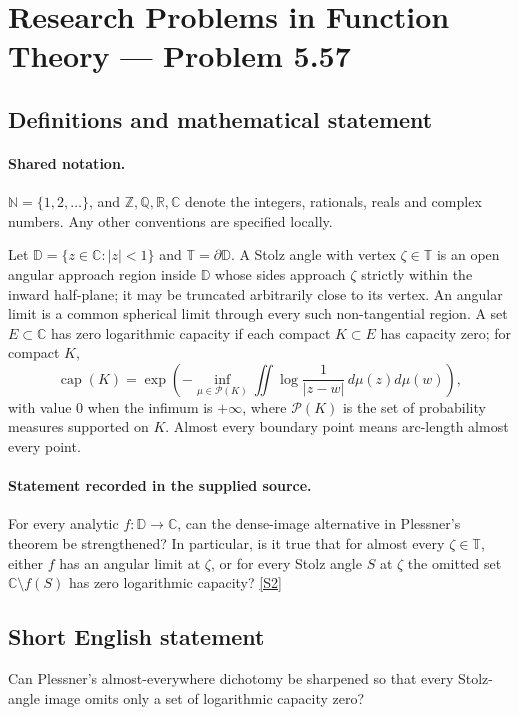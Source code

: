 \documentclass[11pt]{book}
\newcommand{\sref}[2]{\hyperlink{source:#1:#2}{[S#2]}}
\begin{document}
\section{Research Problems in Function Theory — Problem 5.57}\label{statement}

\subsection{Definitions and mathematical statement}

\paragraph{Shared notation.}$\mathbb N=\{1,2,\ldots\}$, and $\mathbb Z,\mathbb Q,\mathbb R,\mathbb C$ denote the integers, rationals, reals and complex numbers. Any other conventions are specified locally.


Let $\mathbb D=\{z\in\mathbb C:|z|<1\}$ and $\mathbb T=\partial\mathbb D$. A Stolz angle with vertex $\zeta\in\mathbb T$ is an open angular approach region inside $\mathbb D$ whose sides approach $\zeta$ strictly within the inward half-plane; it may be truncated arbitrarily close to its vertex. An angular limit is a common spherical limit through every such non-tangential region. A set $E\subset\mathbb C$ has zero logarithmic capacity if each compact $K\subset E$ has capacity zero; for compact $K$, \[\operatorname{cap}(K)=\exp\left(-\inf_{\mu\in\mathcal P(K)}\iint\log\frac1{|z-w|}\,d\mu(z)d\mu(w)\right),\] with value $0$ when the infimum is $+\infty$, where $\mathcal P(K)$ is the set of probability measures supported on $K$. Almost every boundary point means arc-length almost every point.
\paragraph{Statement recorded in the supplied source.}
For every analytic $f:\mathbb D\to\mathbb C$, can the dense-image alternative in Plessner’s theorem be strengthened? In particular, is it true that for almost every $\zeta\in\mathbb T$, either $f$ has an angular limit at $\zeta$, or for every Stolz angle $S$ at $\zeta$ the omitted set $\mathbb C\setminus f(S)$ has zero logarithmic capacity? \sref{statement}{2}
\subsection{Short English statement}
Can Plessner’s almost-everywhere dichotomy be sharpened so that every Stolz-angle image omits only a set of logarithmic capacity zero?
\end{document}
